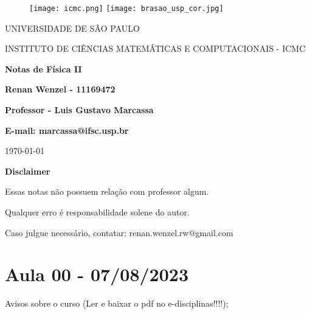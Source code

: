 \documentclass{article}
\begin{document}
\begin{figure}[ht]
	\texttt{[image: icmc.png]}
	\hspace{7cm}
	\texttt{[image: brasao\_usp\_cor.jpg]}
	\endminipage
\end{figure}

\begin{center}
	\vspace{1cm}
	\LARGE
	UNIVERSIDADE DE S\~AO PAULO

	\vspace{1.3cm}
	\LARGE
	INSTITUTO DE CI\^ENCIAS MATEM\'ATICAS E COMPUTACIONAIS - ICMC

	\vspace{1.7cm}
	\Large
	\textbf{Notas de Física II}

	\vspace{1.3cm}
	\large
	\textbf{Renan Wenzel - 11169472}

	\vspace{1.3cm}
	\large
	\textbf{Professor - Luis Gustavo Marcassa}

	\textbf{E-mail: marcassa@ifsc.usp.br}

	\vspace{1.3cm}
	\today
\end{center}

\newpage
\textbf{{\Huge Disclaimer}}
\vspace{5cm}

{\huge Essas notas não possuem relação com professor algum.

	Qualquer erro é responsabilidade solene do autor.

	Caso julgue necessário, contatar: renan.wenzel.rw@gmail.com}
\newpage

\tableofcontents

\newpage

\section{Aula 00 - 07/08/2023}
Avisos sobre o curso (Ler e baixar o pdf no e-disciplinas!!!!);
\newpage
{}
\newpage
{}
\newpage
{}
\newpage
{}
\newpage
{}
\newpage
{}
\newpage
{}
\newpage
{}
\newpage
{}
\newpage
{}
\newpage
{}
\newpage
{}
\newpage
{}
\newpage
{}
\newpage
{}
\newpage
{}
\newpage
{}
\newpage
{}
\newpage
{}
\newpage
{}
\newpage
{}
\newpage
{}
\newpage
{}
\newpage
{}
\newpage
{}
\newpage
{}
\newpage
{}
\newpage
{}
\newpage
{}
\newpage
{}
\newpage
{}
\newpage
{}
\newpage
{}
\newpage
\end{document}

